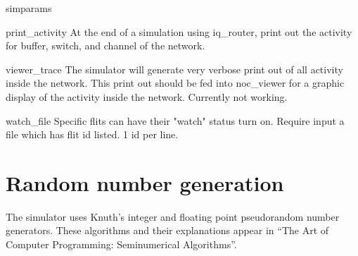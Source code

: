 \documentclass[11pt]{article}
\begin{document}
\begin{opt_list}{simparams}
\item[print\_activity] At the end of a simulation using iq\_router, print out the activity for buffer, switch, and channel of the network. 

\item[viewer\_trace] The simulator will generate very verbose print out of all activity inside the network. This print out should be fed into noc\_viewer for a graphic display of the activity inside the network. Currently not working. 

\item[watch\_file] Specific flits can have their "watch" status turn on. Require input a file which has flit id listed. 1 id per line. 

\end{opt_list}


\appendix
\section{Random number generation}

The simulator uses Knuth's integer and floating point pseudorandom
number generators.  These algorithms and their explanations appear in
``The Art of Computer Programming: Seminumerical Algorithms''.
\end{document}
